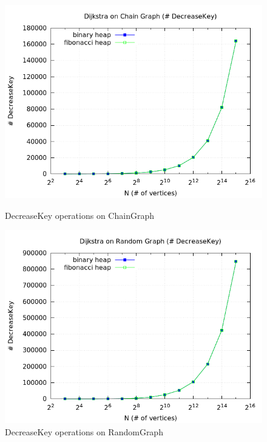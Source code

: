 \documentclass[a4paper,oneside,article,11pt]{memoir}
\begin{document}
\begin{figure}[H]
\centering
\begin{minipage}{0.48\columnwidth}
  \centering
  \includegraphics[width=\linewidth]{../res/dijkstra/d_chain_dk.png}%
  \caption{DecreaseKey operations on ChainGraph}
  \label{fig:dijkstra_chain_dk}
\end{minipage}%
\hfill
\begin{minipage}{0.48\columnwidth}
  \centering
  \includegraphics[width=\linewidth]{../res/dijkstra/d_random_dk.png}%
  \caption{DecreaseKey operations on RandomGraph}
  \label{fig:dijkstra_random_dk}
\end{minipage}
\end{figure}
\end{document}
